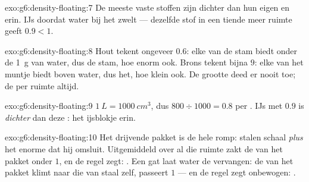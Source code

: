 \begin{solution}{exo:g6:density-floating:7}
De meeste vaste stoffen zijn dichter dan hun eigen
 en  erin. IJs  doordat water bij het
 zwelt --- dezelfde stof in een tiende meer ruimte geeft
 $0.9 < 1$.
\end{solution}

\begin{solution}{exo:g6:density-floating:8}
Hout tekent ongeveer $0.6$: elke  van de stam biedt
onder de \qty{1}{g} van water, dus  de stam, hoe enorm ook. Brons
tekent bijna $9$: elke  van het muntje biedt boven
water, dus  het, hoe klein ook. De grootte deed er nooit toe; de
 per ruimte altijd.
\end{solution}

\begin{solution}{exo:g6:density-floating:9}
$\qty{1}{L} = \qty{1000}{cm^3}$, dus $800 \div 1000 = 0.8$
 per . IJs met $0.9$ is
\emph{dichter} dan deze : het ijsblokje  erin.
\end{solution}

\begin{solution}{exo:g6:density-floating:10}
Het drijvende pakket is de hele romp: stalen schaal \emph{plus} het
enorme   dat hij omsluit. Uitgemiddeld over al die ruimte
zakt de  van het pakket onder $1$, en de regel zegt:
. Een gat laat water de  vervangen: de
 van het pakket klimt naar die van staal zelf, passeert $1$
--- en de regel zegt onbewogen: .
\end{solution}

